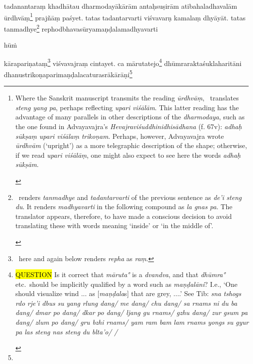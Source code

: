 \documentclass[naipra.tex]{subfiles}
\begin{document}
\begin{sanskrit}
\pstart
tadanantaraṃ khadhātau dharmodayākārām antaḥsuṣirām atibahaladhavalām ūrdhvāṃ\footnote{\begin{english}
	Where the Sanskrit manuscript transmits the reading \emph{ūrdhvāṃ}, \TIB\ translates \emph{steng yang pa}, perhaps reflecting \emph{upari viśālām}.
	This latter reading has the advantage of many parallels in other descriptions of the \emph{dharmodaya}, such as the one found in Advayavajra's \emph{Hevajraviśuddhinidhisādhana} (f. 67v): \emph{adhaḥ sūkṣaṃ upari viśālaṃ trikoṇam}.
	Perhaps, however, Advayavajra wrote \emph{ūrdhvām} (`upright') as a more telegraphic description of the shape; otherwise, if we read \emph{upari viśālāṃ}, one might also expect to see here the words \emph{adhaḥ sūkṣām}. 
\end{english}} prajñāṃ paśyet.
tatas tadantarvarti viśvavarṇ  kamalaṃ dhyāyāt.
tatas tanmadhye\footnote{\begin{english}
	\TIB\ renders \emph{tanmadhye} and \emph{tadantarvarti} of the previous sentence as \emph{de'i steng du}.
	It renders \emph{madhyavarti} in the following compound as \emph{la gnas pa}.  
	The translator appears, therefore, to have made a conscious decision to avoid translating these with words meaning `inside' or `in the middle of'.
\end{english}} rephodbhavasūryamaṇḍalamadhyavarti\dsh \begin{mantra}hūṁ\end{mantra}\dsh kārapariṇataṃ\footnote{
	\TIB\ here and again below renders \emph{repha} as \emph{raṃ}.
} viśvavajraṃ cintayet. 
 ca mārutatejo\footnote{\begin{english}
	\hl{QUESTION} Is it correct that \emph{māruta°} is a \emph{dvandva}, and that \emph{dhūmra°} etc.\ should be implicitly qualified by a word such as \emph{maṇḍalāni}? I.e., `One should visualize wind ... as [\emph{maṇḍala}s] that are grey, ....' See Tib: \emph{sna tshogs rdo rje'i dbus su yang rlung dang/ me dang/ chu dang/ sa rnams ni du ba dang/ dmar po dang/ dkar po dang/ ljang gu rnams/ gzhu dang/ zur gsum pa dang/ zlum po dang/ gru bzhi rnams/ yam ram bam lam rnams yongs su gyur pa las steng nas steng du blta'o/ /}
\end{english}} dhūmraraktaśuklaharitāni dhanustrikoṇaparimaṇḍalacaturasrākārāṇi\footnote{
}
\end{sanskrit}
\end{document}
